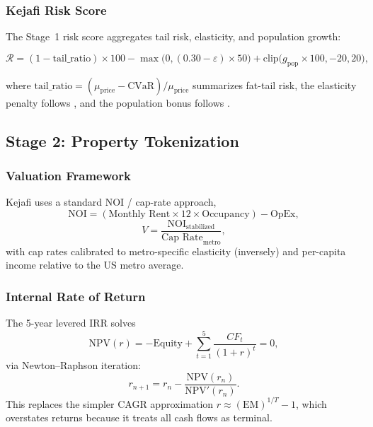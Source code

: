 \documentclass[11pt,letterpaper]{article}
\begin{document}
\subsubsection{Kejafi Risk Score}

The Stage~1 risk score aggregates tail risk, elasticity, and population growth:
\begin{eqbox}
\begin{equation}
\mathcal{R} =
(1 - \text{tail\_ratio}) \times 100
- \max\bigl(0,(0.30 - \varepsilon)\times 50\bigr)
+ \text{clip}\bigl(g_{\text{pop}}\times 100,-20,20\bigr),
\label{eq:risk_score}
\end{equation}
\end{eqbox}
where $\text{tail\_ratio} = (\mu_{\text{price}} - \text{CVaR})/\mu_{\text{price}}$ summarizes
fat-tail risk, the elasticity penalty follows \citet{saiz2010}, and the population bonus
follows \citet{glaeser2018}.

\subsection{Stage 2: Property Tokenization}

\subsubsection{Valuation Framework}

Kejafi uses a standard NOI / cap-rate approach,
\begin{equation}
\text{NOI} =
(\text{Monthly Rent} \times 12 \times \text{Occupancy}) - \text{OpEx},
\label{eq:noi}
\end{equation}
\begin{equation}
V = \frac{\text{NOI}_{\text{stabilized}}}{\text{Cap Rate}_{\text{metro}}},
\label{eq:value}
\end{equation}
with cap rates calibrated to metro-specific elasticity (inversely) and per-capita income
relative to the US metro average.

\subsubsection{Internal Rate of Return}

The 5-year levered IRR solves
\begin{equation}
\text{NPV}(r) = -\text{Equity} + \sum_{t=1}^{5} \frac{CF_t}{(1+r)^t} = 0,
\label{eq:npv}
\end{equation}
via Newton--Raphson iteration:
\begin{equation}
r_{n+1} = r_n - \frac{\text{NPV}(r_n)}{\text{NPV}'(r_n)}.
\label{eq:nr}
\end{equation}
This replaces the simpler CAGR approximation $r \approx (\text{EM})^{1/T} - 1$, which
overstates returns because it treats all cash flows as terminal.
\end{document}
